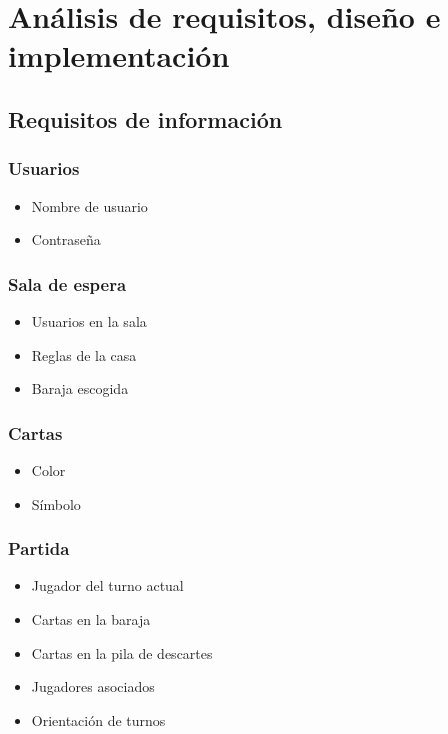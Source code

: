 \newcommand\req{%
  \stepcounter{reqid}%
  R-\padzeroes[3]{\decimal{reqid}}
}
\newcommand\reqcase{%
  \stepcounter{caseid}%
  C-\padzeroes[3]{\decimal{caseid}}
}

\chapter{An\'alisis de requisitos, dise\~no e implementaci\'on}\label{requisitos}

\section{Requisitos de información}
\subsection{Usuarios}
\begin{itemize}
  \item Nombre de usuario
  \item Contraseña
\end{itemize}
\subsection{Sala de espera}
\begin{itemize}
  \item Usuarios en la sala
  \item Reglas de la casa
  \item Baraja escogida
\end{itemize}
\subsection{Cartas}
\begin{itemize}
  \item Color
  \item Símbolo
\end{itemize}
\subsection{Partida}
\begin{itemize}
  \item Jugador del turno actual
  \item Cartas en la baraja
  \item Cartas en la pila de descartes
  \item Jugadores asociados
  \item Orientación de turnos
\end{itemize}
